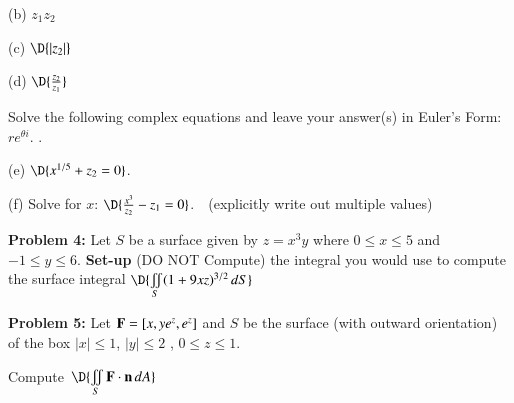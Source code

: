 \documentclass[11pt]{article}
\begin{document}
\vspace{1.0cm}

(b) \quad $z_1 z_2$

\vspace{1.5cm}

(c) \quad $\D{|z_2|}$

\vspace{1.5cm}

(d) \quad $\D{\frac{z_2}{z_1}}$

\vspace{2.5cm}

Solve the following complex equations and leave your answer(s) in Euler's Form: $re^{\theta i}$. .

\vspace{0.1cm}

(e)  $\D{x^{1/5} + z_2 = 0}$.

\vspace{4.0cm}

(f) Solve for $x$: \quad $\D{\frac{x^3}{z_2}-z_1=0}$.  \,\, (explicitly write out multiple values)

\thispagestyle{empty}
\newpage
\thispagestyle{empty}

{\bf Problem 4:}  Let $S$ be a surface given by $z=x^3y$ where $0 \le x \le 5$ and $-1 \le y \le 6$.  {\bf Set-up} (DO NOT Compute) the integral you would use to compute the surface integral \qquad $\D{\iint \limits_{S} (1 + 9xz)^{3/2}\, dS}$

\thispagestyle{empty}
\newpage
\thispagestyle{empty}
	
{\bf Problem 5:} Let $\text{\bf F} = [x,ye^z,e^z]$ and $S$ be the surface (with outward orientation) of the box $|x|\le 1$, $|y|\le 2$ , $0\le z \le 1$.

\vspace{0.2cm}

Compute \,$\D{\iint \limits_{S} \text{\bf F}\cdot \text{\bf n} \, dA}$

\vspace{0.2cm}

\thispagestyle{empty}
\newpage
\thispagestyle{empty}
\end{document}
